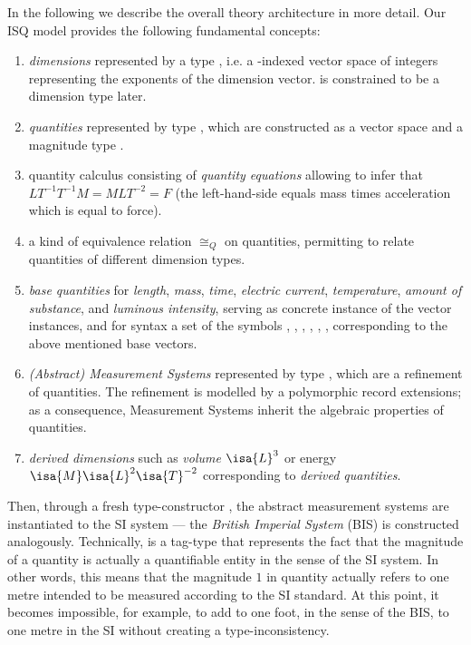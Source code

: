\documentclass[11pt,a4paper]{book}
\begin{document}
In the following we describe the overall theory architecture in more detail.
Our ISQ model provides the following fundamental concepts:
%
\begin{enumerate}%
\item \emph{dimensions} represented by a type  , i.e. a -indexed
      vector space of integers representing the exponents of the dimension vector. 
       is constrained to be a dimension type later.


\item \emph{quantities} represented by type , which are constructed as 
      a  vector space and a magnitude type . 

\item{quantity calculus} consisting of \emph{quantity equations} allowing to infer that 
      $LT^{-1}T^{-1}M = MLT^{-2} = F$ 
      (the left-hand-side equals mass times acceleration which is equal to force). 

\item a kind of equivalence relation $\cong_{Q}$ on quantities, permitting to relate
      quantities of different dimension types.


\item \emph{base quantities} for
      \emph{length}, \emph{mass}, \emph{time}, \emph{electric current},
      \emph{temperature}, \emph{amount of substance}, and \emph{luminous intensity}, 
      serving as concrete instance of the vector instances, and for syntax
      a set of the symbols  , , , ,  
      \isa{{\isasymTheta}}, ,  corresponding to the above mentioned
      base vectors.

\item \emph{(Abstract) Measurement Systems} represented by type 
      , which are a refinement
      of quantities. The refinement is modelled by a polymorphic record extensions; as a 
      consequence, Measurement Systems inherit the algebraic properties of quantities.
 
\item \emph{derived dimensions} such as \emph{volume} $\isa{L}^3$ or energy 
      $\isa{M}\isa{L}^2\isa{T}^{-2}$ corresponding to \emph{derived quantities}.

\end{enumerate}

Then, through a fresh type-constructor , the abstract measurement systems are instantiated to the SI system ---
the \emph{British Imperial System} (BIS) is constructed analogously.  Technically,  is a tag-type that
represents the fact that the magnitude of a quantity is actually a quantifiable entity in the sense of the SI system. In
other words, this means that the magnitude $1$ in quantity  actually refers to one metre intended to be
measured according to the SI standard. At this point, it becomes impossible, for example, to add to one foot, in the
sense of the BIS, to one metre in the SI without creating a type-inconsistency.
\end{document}
